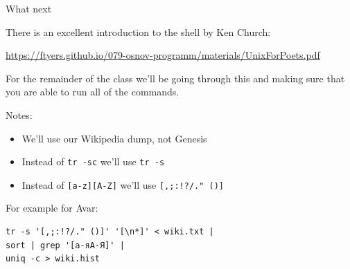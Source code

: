 \documentclass[10pt, compress]{beamer}
\begin{document}
\begin{frame}[fragile]{What next}

There is an excellent introduction to the shell by Ken Church:

{\small
\url{https://ftyers.github.io/079-osnov-programm/materials/UnixForPoets.pdf}
}

For the remainder of the class we'll be going through this and
making sure that you are able to run all of the commands.

Notes:
\begin{itemize}
  \item We'll use our Wikipedia dump, not Genesis
  \item Instead of {\tt tr -sc} we'll use {\tt tr -s} 
  \item Instead of {\tt [a-z][A-Z]} we'll use {\tt [,;:!?/." ()]} 
\end{itemize}

For example for Avar:
\begin{verbatim}
tr -s '[,;:!?/." ()]' '[\n*]' < wiki.txt | 
sort | grep '[а-яА-Я]' |
uniq -c > wiki.hist
\end{verbatim}

\end{frame}
\end{document}
